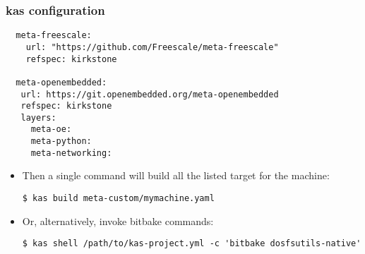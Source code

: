 \begin{frame}[fragile]
  \frametitle{kas configuration}
  \fontsize{9}{9}\selectfont
  \begin{block}{}
  \begin{verbatim}
  meta-freescale:
    url: "https://github.com/Freescale/meta-freescale"
    refspec: kirkstone

  meta-openembedded:
   url: https://git.openembedded.org/meta-openembedded
   refspec: kirkstone
   layers:
     meta-oe:
     meta-python:
     meta-networking:
  \end{verbatim}
  \end{block}


  \begin{itemize}
  \item Then a single command will build all the listed target for the
machine:

  \begin{verbatim}
$ kas build meta-custom/mymachine.yaml
  \end{verbatim}

  \item Or, alternatively, invoke bitbake commands:

  \begin{verbatim}
$ kas shell /path/to/kas-project.yml -c 'bitbake dosfsutils-native'
  \end{verbatim}
  \end{itemize}
\end{frame}

